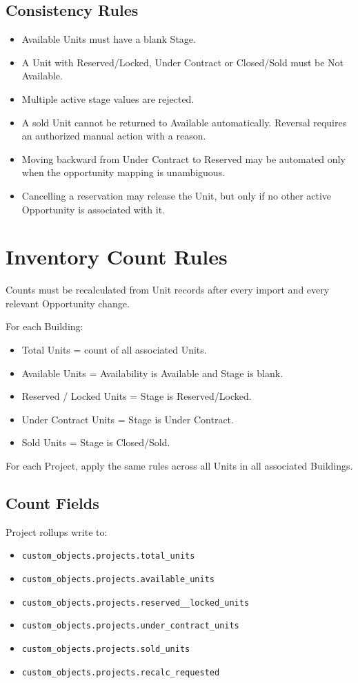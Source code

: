 \documentclass[10pt]{article}
\newcommand{\key}[1]{\texttt{\small #1}}
\begin{document}
\subsection{Consistency Rules}
\begin{itemize}
\item Available Units must have a blank Stage.
\item A Unit with Reserved/Locked, Under Contract or Closed/Sold must be Not Available.
\item Multiple active stage values are rejected.
\item A sold Unit cannot be returned to Available automatically. Reversal requires an authorized manual action with a reason.
\item Moving backward from Under Contract to Reserved may be automated only when the opportunity mapping is unambiguous.
\item Cancelling a reservation may release the Unit, but only if no other active Opportunity is associated with it.
\end{itemize}

\section{Inventory Count Rules}
Counts must be recalculated from Unit records after every import and every relevant Opportunity change.

For each Building:
\begin{itemize}
\item Total Units = count of all associated Units.
\item Available Units = Availability is Available and Stage is blank.
\item Reserved / Locked Units = Stage is Reserved/Locked.
\item Under Contract Units = Stage is Under Contract.
\item Sold Units = Stage is Closed/Sold.
\end{itemize}

For each Project, apply the same rules across all Units in all associated Buildings.

\subsection{Count Fields}
Project rollups write to:
\begin{itemize}
\item \key{custom\_objects.projects.total\_units}
\item \key{custom\_objects.projects.available\_units}
\item \key{custom\_objects.projects.reserved\_\_locked\_units}
\item \key{custom\_objects.projects.under\_contract\_units}
\item \key{custom\_objects.projects.sold\_units}
\item \key{custom\_objects.projects.recalc\_requested}
\end{itemize}
\end{document}
